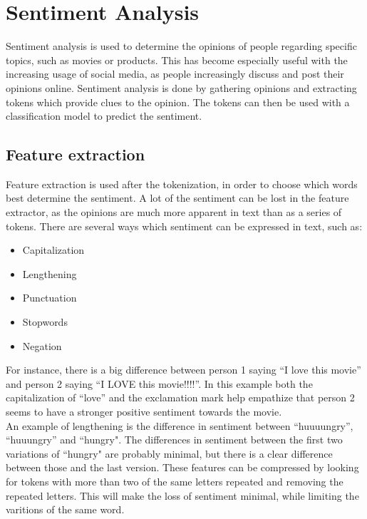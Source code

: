 \section{Sentiment Analysis}
Sentiment analysis is used to determine the opinions of people regarding
specific topics, such as movies or products. This has become especially useful
with the increasing usage of social media, as people increasingly discuss and
post their opinions online. Sentiment analysis is done by
gathering opinions and extracting tokens which provide clues to the opinion. The tokens can then be
used with a classification model to predict the sentiment. 

\subsection{Feature extraction} 
Feature extraction is used after the tokenization, in order to choose which
words best determine the sentiment. A lot of the sentiment can be lost in the
feature extractor, as the opinions are much more apparent in text than as a
series of tokens. There are several ways which sentiment can be expressed in
text, such as\citep[Overview.3-4]{Sentiment}:

\begin{itemize}
  \item Capitalization 
  \item Lengthening
  \item Punctuation
  \item Stopwords
  \item Negation
\end{itemize}

For instance, there is a big difference between person 1 saying ``I love this
movie'' and person 2 saying ``I LOVE this movie!!!!''. In this example both the
capitalization of ``love'' and the exclamation mark help empathize that person
2 seems to have a stronger positive sentiment towards the movie.\\


An example of lengthening is the difference in sentiment between ``huuuungry'',
``huuungry'' and ``hungry". The differences in sentiment between the first two
variations of ``hungry" are probably minimal, but there is a clear difference
between those and the last version. These features can be compressed by looking
for tokens with more than two of the same letters repeated and removing the
repeated letters. This will make the loss of sentiment minimal, while limiting
the varitions of the same word.\nl

